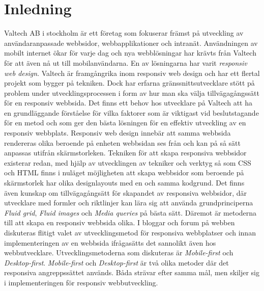 \documentclass[11pt]{article}
\begin{document}
\tableofcontents
\newpage


\section{Inledning}
Valtech AB i stockholm är ett företag som fokuserar främst på utveckling av användaranpassade webbsidor, webbapplikationer och intranät. Användningen av mobilt internet ökar för varje dag och nya webblösningar har krävts från Valtech för att även nå ut till mobilanvändarna. En av lösningarna har varit \textit{responsiv web design}. Valtech är framgångrika inom responsiv web design och har ett flertal projekt som bygger på tekniken. Dock har erfarna gränssnittsutvecklare stött på problem under utvecklingsprocessen i form av hur man ska välja tillvägagångssätt för en responsiv webbsida. Det finns ett behov hos utvecklare på Valtech att ha en grundläggande förståelse för vilka faktorer som är viktigast vid beslutstagande för en metod och som ger den bästa lösningen för en effektiv utveckling av en responsiv webbplats. Responsiv web design innebär att samma webbsida rendereras olika beroende på enheten webbsidan ses från och kan på så sätt anpassas utifrån skärmstorleken. Tekniken för att skapa responsiva webbsidor existerar redan, med hjälp av utvecklingen av tekniker och verktyg så som CSS och HTML finns i nuläget möjligheten att skapa webbsidor som beroende på skärmstorlek har olika designlayouts med en och samma kodgrund. Det finns även kunskap om tillvägagångsätt för skapandet av responsiva webbsidor, där utvecklare med formler och riktlinjer kan lära sig att använda grundprinciperna \textit{Fluid grid}, \textit{Fluid images} och \textit{Media queries} på bästa sätt. Däremot är metoderna till att skapa en responsiv webbsida olika. I bloggar och forum på webben diskuteras flitigt valet av utvecklingsmetod för responsiva webbplatser och innan implementeringen av en webbsida ifrågasätts det sannolikt även hos webbutvecklare. Utvecklingsmetoderna som diskuteras är \textit{Mobile-first} och \textit{Desktop-first}. \textit{Mobile-first} och \textit{Desktop-first} är två olika metoder där det responsiva angreppssättet används. Båda strävar efter samma mål, men skiljer sig i implementeringen för responsiv webbutveckling.
\end{document}
